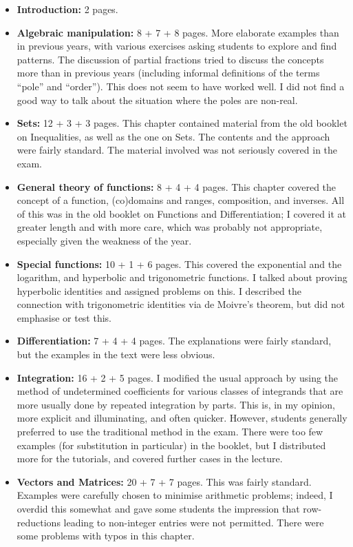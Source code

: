 \documentclass{amsart}
\begin{document}
\begin{itemize}
 \item \textbf{Introduction:} 2 pages.
 \item \textbf{Algebraic manipulation:} 8 + 7 + 8 pages.  More
  elaborate examples than in previous years, with various exercises
  asking students to explore and find patterns.  The discussion of
  partial fractions tried to discuss the concepts more than in
  previous years (including informal definitions of the terms ``pole''
  and ``order'').  This does not seem to have worked well.  I did not
  find a good way to talk about the situation where the poles are
  non-real. 
 \item \textbf{Sets:} 12 + 3 + 3 pages.  This chapter contained
  material from the old booklet on Inequalities, as well as the one on
  Sets.  The contents and the approach were fairly standard.  The
  material involved was not seriously covered in the exam.
 \item \textbf{General theory of functions:} 8 + 4 + 4 pages.  This
  chapter covered the concept of a function, (co)domains and ranges,
  composition, and inverses.  All of this was in the old booklet on
  Functions and Differentiation; I covered it at greater length and
  with more care, which was probably not appropriate, especially given
  the weakness of the year.
 \item \textbf{Special functions:} 10 + 1 + 6 pages.  This covered the
  exponential and the logarithm, and hyperbolic and trigonometric
  functions.  I talked about proving hyperbolic identities and
  assigned problems on this.  I described the connection with
  trigonometric identities via de Moivre's theorem, but did not
  emphasise or test this.
 \item \textbf{Differentiation:} 7 + 4 + 4 pages.  The explanations
  were fairly standard, but the examples in the text were less
  obvious. 
 \item \textbf{Integration:} 16 + 2 + 5 pages.  I modified the usual
  approach by using the method of undetermined coefficients for
  various classes of integrands that are more usually done by repeated
  integration by parts.  This is, in my opinion, more explicit and
  illuminating, and often quicker.  However, students generally
  preferred to use the traditional method in the exam.  There were too
  few examples (for substitution in particular) in the booklet, but I
  distributed more for the tutorials, and covered further cases in the
  lecture. 
 \item \textbf{Vectors and Matrices:} 20 + 7 + 7 pages.  This was
  fairly standard.  Examples were carefully chosen to minimise
  arithmetic problems; indeed, I overdid this somewhat and gave some
  students the impression that row-reductions leading to non-integer
  entries were not permitted.  There were some problems with typos in
  this chapter.
\end{itemize}
\end{document}
